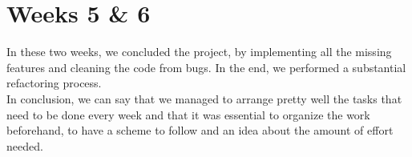 \section{Weeks 5 \& 6}
In these two weeks, we concluded the project, by implementing all the missing features and cleaning the code from bugs. In the end, we performed a substantial refactoring process.\\
In conclusion, we can say that we managed to arrange pretty well the tasks that need to be done every week and that it was essential to organize the work beforehand, to have a scheme to follow and an idea about the amount of effort needed.
